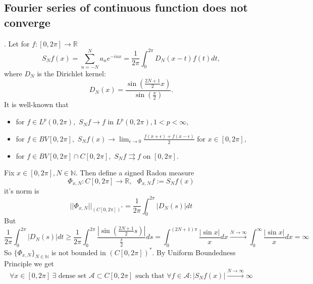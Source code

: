 \documentclass[12pt,a4paper]{article}
\renewcommand\:{\colon}
\begin{document}
\subsection{Fourier series of continuous function does not converge}.
Let for $f\: [0,2\pi]\to \mathbb{R}$
\begin{equation*}
	S_Nf(x)=\sum_{n=-N}^Na_ne^{-inx} = \frac{1}{2\pi}\int_0^{2\pi}D_N(x-t)f(t)dt,
\end{equation*}
where $D_N$ is the Dirichlet kernel:
\begin{equation*}
  D_N(x)=\frac{\sin\left(\frac{2N+1}{2}x\right)}{\sin\left(\frac{x}{2}\right)}.
\end{equation*}
It is well-known that 
\begin{itemize}
	\item for $f\in L^{p}(0,2\pi),$ $S_Nf \to f$ in $L^{p}(0,2\pi), 1<p<\infty,$
	\item for $f\in BV[0,2\pi],$ $S_Nf(x)\to \lim_{\epsilon\to 0}\frac{f(x+\epsilon)+f(x-\epsilon)}{2}$ for $x\in[0,2\pi],$ 
	\item for $f\in BV[0,2\pi]\cap C[0,2\pi],$ $S_Nf\rightrightarrows f$ on $[0,2\pi].$ 
\end{itemize}
Fix $x\in [0,2\pi], N\in \mathbb{N}.$ Then define a signed Radon measure
\begin{equation*}
	\Phi_{x,N}\: C[0,2\pi]\to \mathbb{R}, \ \ \ \Phi_{x,N}f := S_Nf(x)
\end{equation*}
it's norm is
\begin{equation*}
	||\Phi_{x,N}||_{(C[0,2\pi])^{*}}=\frac{1}{2\pi}\int_0^{2\pi}|D_N(s)|dt
\end{equation*}
But
\begin{equation*}
	\frac{1}{2\pi}\int_0^{2\pi}|D_N(s)|dt \geq \frac{1}{2\pi}\int_0^{2\pi} \frac{|\sin\left(\frac{2N+1}{2}s\right)|}{\frac{s}{2}}ds = \int_0^{(2N+1)\pi}\frac{|\sin x|}{x}dx \stackrel{N\to \infty}{\to} \int_0^{\infty}\frac{|\sin x|}{x}dx=\infty
\end{equation*}
So $\{\Phi_{x,N}\}_{N\in \mathbb{N}}$ is not bounded in $(C[0,2\pi])^{*}.$ By Uniform Boundedness Principle we get 
\begin{equation}
	\forall x\in [0,2\pi] \ \exists \text{ dense set } \mathcal{A}\subset C[0,2\pi] \text{ such that } \forall f\in \mathcal{A}\: |S_Nf(x)|\stackrel{N\to\infty}{\to} \infty
\end{equation}
\end{document}
